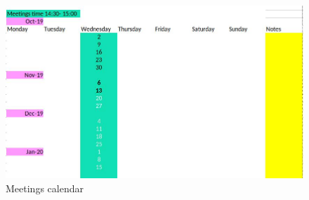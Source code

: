 \documentclass{scrartcl}
\begin{document}
\begin{figure}[H]
\centering
\includegraphics[width = 130mm]{agenda.jpg}
\caption{Meetings calendar}
\label{calendar}
\end{figure}
\end{document}
